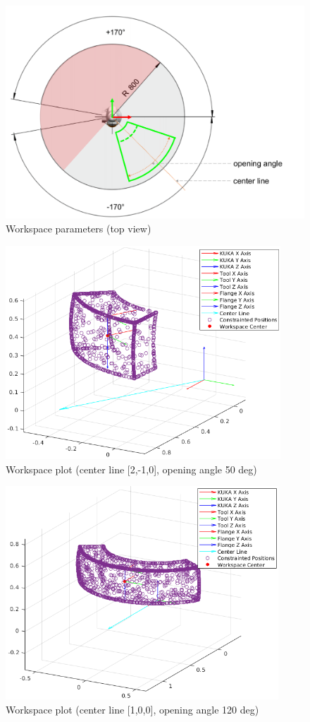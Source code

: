 \documentclass[headsepline,footinclude=false,fontsize=11pt,paper=a4,listof=totoc,bibliography=totoc,BCOR=12mm,DIV=14]{scrbook}
\begin{document}
\begin{figure}[h!]
    \centering
    \includegraphics[height=8cm]{images/ws_params_top}
    \caption{Workspace parameters (top view) \cite[p.~36]{KukaManualFlange}}
    \label{fig:ws_params_top}
\end{figure}

\newpage

\begin{figure}[h!]
    \centering
    \includegraphics[height=8cm]{figures/ws_1}
    \caption{Workspace plot (center line [2,-1,0], opening angle 50 deg)}
    \label{fig:ws_plot_1}
\end{figure}

\begin{figure}[h!]
    \centering
    \includegraphics[height=8cm]{figures/ws_2}
    \caption{Workspace plot (center line [1,0,0], opening angle 120 deg)}
    \label{fig:ws_plot_2}
\end{figure}
\newpage
\end{document}
